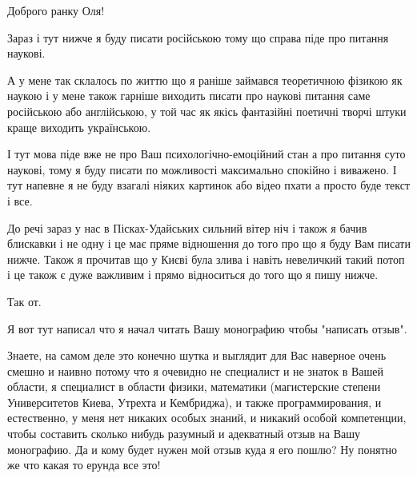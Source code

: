  
 
 
 
 

Доброго ранку Оля! 

Зараз і тут нижче я буду писати російською тому що справа піде про питання
наукові.

А у мене так склалось по життю що я раніше займався теоретичною фізикою як
наукою і у мене також гарніше виходить писати про наукові питання саме
російською або англійською, у той час як якісь фантазійні поетичні творчі штуки
краще виходить українською.

І тут мова піде вже не про Ваш психологічно-емоційний стан а про питання суто
наукові, тому я буду писати по можливості максимально спокійно і виважено. І
тут напевне я не буду взагалі ніяких картинок або відео пхати а просто буде
текст і все.

До речі зараз у нас в Пісках-Удайських сильний вітер ніч і також я бачив
блискавки і не одну і це має пряме відношення до того про що я буду Вам писати
нижче. Також я прочитав що у Києві була злива і навіть невеличкий такий потоп і
це також є дуже важливим і прямо відноситься до того що я пишу нижче.

Так от.

Я вот тут написал что я начал читать Вашу монографию чтобы "написать отзыв".

Знаете, на самом деле это конечно шутка и выглядит для Вас наверное очень
смешно и наивно потому что я очевидно не специалист и не знаток в Вашей
области, я специалист в области физики, математики (магистерские степени
Университетов Киева, Утрехта и Кембриджа), и также программирования, и
естественно, у меня нет никаких особых знаний, и никакий особой компетенции,
чтобы составить сколько нибудь разумный и адекватный отзыв на Вашу монографию.
Да и кому будет нужен мой отзыв куда я его пошлю? Ну понятно же что какая то
ерунда все это!

